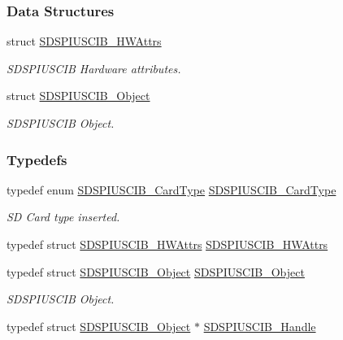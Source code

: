 \subsubsection*{Data Structures}
\begin{DoxyCompactItemize}
\item 
struct \hyperlink{struct_s_d_s_p_i_u_s_c_i_b___h_w_attrs}{S\+D\+S\+P\+I\+U\+S\+C\+I\+B\+\_\+\+H\+W\+Attrs}
\begin{DoxyCompactList}\small\item\em S\+D\+S\+P\+I\+U\+S\+C\+I\+B Hardware attributes. \end{DoxyCompactList}\item 
struct \hyperlink{struct_s_d_s_p_i_u_s_c_i_b___object}{S\+D\+S\+P\+I\+U\+S\+C\+I\+B\+\_\+\+Object}
\begin{DoxyCompactList}\small\item\em S\+D\+S\+P\+I\+U\+S\+C\+I\+B Object. \end{DoxyCompactList}\end{DoxyCompactItemize}
\subsubsection*{Typedefs}
\begin{DoxyCompactItemize}
\item 
typedef enum \hyperlink{_s_d_s_p_i_u_s_c_i_b_8h_a82051f5c4a349b60bc2205ec32cd74c1}{S\+D\+S\+P\+I\+U\+S\+C\+I\+B\+\_\+\+Card\+Type} \hyperlink{_s_d_s_p_i_u_s_c_i_b_8h_a802d35208b5fda397e7de76e62db1b7c}{S\+D\+S\+P\+I\+U\+S\+C\+I\+B\+\_\+\+Card\+Type}
\begin{DoxyCompactList}\small\item\em S\+D Card type inserted. \end{DoxyCompactList}\item 
typedef struct \hyperlink{struct_s_d_s_p_i_u_s_c_i_b___h_w_attrs}{S\+D\+S\+P\+I\+U\+S\+C\+I\+B\+\_\+\+H\+W\+Attrs} \hyperlink{_s_d_s_p_i_u_s_c_i_b_8h_ae05ce574f2adf5c1baf1ae53c2824576}{S\+D\+S\+P\+I\+U\+S\+C\+I\+B\+\_\+\+H\+W\+Attrs}
\item 
typedef struct \hyperlink{struct_s_d_s_p_i_u_s_c_i_b___object}{S\+D\+S\+P\+I\+U\+S\+C\+I\+B\+\_\+\+Object} \hyperlink{_s_d_s_p_i_u_s_c_i_b_8h_ad59c8528a1b9ee05380131ed4448044c}{S\+D\+S\+P\+I\+U\+S\+C\+I\+B\+\_\+\+Object}
\begin{DoxyCompactList}\small\item\em S\+D\+S\+P\+I\+U\+S\+C\+I\+B Object. \end{DoxyCompactList}\item 
typedef struct \hyperlink{struct_s_d_s_p_i_u_s_c_i_b___object}{S\+D\+S\+P\+I\+U\+S\+C\+I\+B\+\_\+\+Object} $\ast$ \hyperlink{_s_d_s_p_i_u_s_c_i_b_8h_ac3caea6a7328f588f8d4a05e365a66aa}{S\+D\+S\+P\+I\+U\+S\+C\+I\+B\+\_\+\+Handle}
\end{DoxyCompactItemize}
